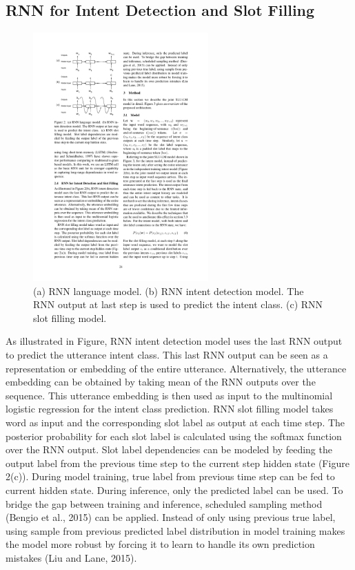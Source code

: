 \subsection{RNN for Intent Detection and Slot Filling}
\begin{figure}
	\centering
	\includegraphics[width=0.6\textwidth]{fig/jslu-rnnmod}
	\caption{(a) RNN language model. (b) RNN intent detection model. The RNN output at last step
		is used to predict the intent class. (c) RNN slot filling model.}
\end{figure}
As illustrated in Figure, RNN intent detection
model uses the last RNN output to predict the utterance
intent class. This last RNN output can be
seen as a representation or embedding of the entire
utterance. Alternatively, the utterance embedding
can be obtained by taking mean of the RNN outputs
over the sequence. This utterance embedding
is then used as input to the multinomial logistic
regression for the intent class prediction.
RNN slot filling model takes word as input and
the corresponding slot label as output at each time
step. The posterior probability for each slot label
is calculated using the softmax function over the
RNN output. Slot label dependencies can be modeled
by feeding the output label from the previous
time step to the current step hidden state (Figure
2(c)). During model training, true label from
previous time step can be fed to current hidden
state. During inference, only the predicted label
can be used. To bridge the gap between training
and inference, scheduled sampling method (Bengio
et al., 2015) can be applied. Instead of only
using previous true label, using sample from previous
predicted label distribution in model training
makes the model more robust by forcing it to
learn to handle its own prediction mistakes (Liu
and Lane, 2015).

